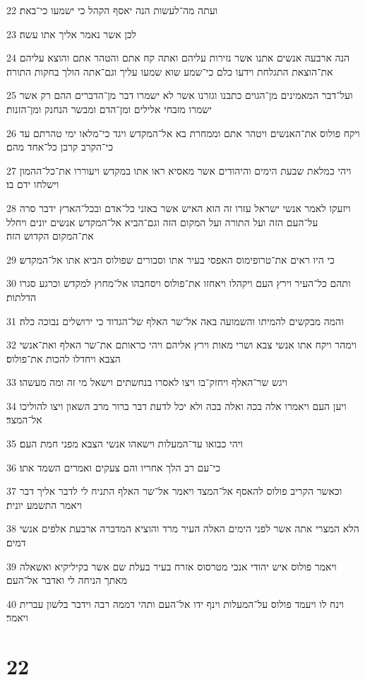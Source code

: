 \par 22 ועתה מה־לעשות הנה יאסף הקהל כי ישמעו כי־באת׃
\par 23 לכן אשר נאמר אליך אתו עשה׃
\par 24 הנה ארבעה אנשים אתנו אשר נזירות עליהם ואתה קח אתם והטהר אתם והוצא עליהם את־הוצאת התגלחת וידעו כלם כי־שמע שוא שמעו עליך וגם־אתה הולך בחקות התורה׃
\par 25 ועל־דבר המאמינים מן־הגוים כתבנו וגזרנו אשר לא ישמרו דבר מן־הדברים ההם רק אשר ישמרו מזבחי אלילים ומן־הדם ומבשר הנחנק ומן־הזנות׃
\par 26 ויקח פולוס את־האנשים ויטהר אתם וממחרת בא אל־המקדש ויגד כי־מלאו ימי טהרתם עד כי־הקרב קרבן כל־אחד מהם׃
\par 27 ויהי כמלאת שבעת הימים והיהודים אשר מאסיא ראו אתו במקדש ויעוררו את־כל־ההמון וישלחו ידם בו׃
\par 28 ויזעקו לאמר אנשי ישראל עזרו זה הוא האיש אשר באזני כל־אדם ובכל־הארץ ידבר סרה על־העם הזה ועל התורה ועל המקום הזה וגם־הביא אל־המקדש אנשים יונים ויחלל את־המקום הקדוש הזה׃
\par 29 כי היו ראים את־טרופימוס האפסי בעיר אתו וסבורים שפולוס הביא אתו אל־המקדש׃
\par 30 ותהם כל־העיר וירץ העם ויקהלו ויאחזו את־פולוס ויסחבהו אל־מחוץ למקדש וכרגע סגרו הדלתות׃
\par 31 והמה מבקשים להמיתו והשמועה באה אל־שר האלף של־הגדוד כי ירושלים נבוכה כלה׃
\par 32 וימהר ויקח אתו אנשי צבא ושרי מאות וירץ אליהם ויהי כראותם את־שר האלף ואת־אנשי הצבא ויחדלו להכות את־פולוס׃
\par 33 ויגש שר־האלף ויחזק־בו ויצו לאסרו בנחשתים וישאל מי זה ומה מעשהו׃
\par 34 ויען העם ויאמרו אלה בכה ואלה בכה ולא יכל לדעת דבר ברור מרב השאון ויצו להוליכו אל־המצד׃
\par 35 ויהי כבואו עד־המעלות וישאהו אנשי הצבא מפני חמת העם׃
\par 36 כי־עם רב הלך אחריו והם צעקים ואמרים השמד אתו׃
\par 37 וכאשר הקריב פולוס להאסף אל־המצד ויאמר אל־שר האלף התניח לי לדבר אליך דבר ויאמר התשמע יונית׃
\par 38 הלא המצרי אתה אשר לפני הימים האלה העיר מרד והוציא המדברה ארבעת אלפים אנשי דמים׃
\par 39 ויאמר פולוס איש יהודי אנכי מטרסוס אזרח בעיר בעלת שם אשר בקיליקיא ואשאלה מאתך הניחה לי ואדבר אל־העם׃
\par 40 וינח לו ויעמד פולוס על־המעלות וינף ידו אל־העם ותהי דממה רבה וידבר בלשון עברית ויאמר׃

\chapter{22}

